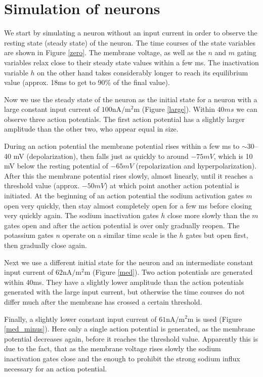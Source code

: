 \documentclass{scrartcl}
\begin{document}
\section{Simulation of neurons}
We start by simulating a neuron without an input current in order to observe the resting state (steady state) of the neuron. The time courses of the state variables are shown in Figure \ref{zero}. The membrane voltage, as well as the $n$ and $m$ gating variables relax close to their steady state values within a few \si{ms}. The inactivation variable $h$ on the other hand takes considerably longer to reach its equilibrium value (approx. 18\si{ms} to get to $90\%$ of the final value).

Now we use the steady state of the neuron as the initial state for a neuron with a large constant input current of $100 \si{\nano\ampere\per\square\milli\meter}$ (Figure \ref{large}). Within $40 \si{ms}$ we can observe three action potentials. The first action potential has a slightly larger amplitude than the other two, who appear equal in size.

During an action potential the membrane potential rises within a few \si{ms} to $\sim$30--40 \si{mV} (depolarization), then falls just as quickly to around $-75 \si{mV}$, which is 10 \si{mV} below the resting potential of $-65\si{mV}$ (repolarization and hyperpolarization). After this the membrane potential rises slowly, almost linearly, until it reaches a threshold value (approx. $-50 \si{mV}$) at which point another action potential is initiated. At the beginning of an action potential the sodium activation gates $m$ open very quickly, then stay almost completely open for a few \si{ms} before closing very quickly again. The sodium inactivation gates $h$ close more slowly than the $m$ gates open and after the action potential is over only gradually reopen. The potassium gates $n$ operate on a similar time scale is the $h$ gates but open first, then gradually close again.

Next we use a different initial state for the neuron and an intermediate constant input current of $62 \si{\nano\ampere\per\square\milli\meter}$ (Figure \ref{med}). Two action potentials are generated within 40\si{ms}. They have a slightly lower amplitude than the action potentials generated with the large input current, but otherwise the time courses do not differ much after the membrane has crossed a certain threshold.

Finally, a slightly lower constant input current of $61 \si{\nano\ampere\per\square\milli\meter}$ is used (Figure \ref{med_minus}). Here only a single action potential is generated, as the membrane potential decreases again, before it reaches the threshold value. Apparently this is due to the fact, that as the membrane voltage rises slowly the sodium inactivation gates close and the  enough to prohibit the strong sodium influx necessary for an action potential.
\end{document}
